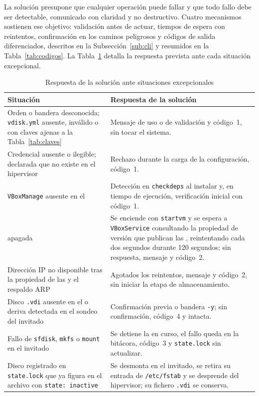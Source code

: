 La solución presupone que cualquier operación puede fallar y que todo fallo debe ser detectable, comunicado con claridad y no destructivo. Cuatro mecanismos sostienen ese objetivo: validación antes de actuar, tiempos de espera con reintentos, confirmación en los caminos peligrosos y códigos de salida diferenciados, descritos en la Subsección~\ref{sub:cli} y resumidos en la Tabla~\ref{tab:codigos}. La Tabla~\ref{tab:casos} detalla la respuesta prevista ante cada situación excepcional.

\begin{table}[H]
    \centering
    \caption{Respuesta de la solución ante situaciones excepcionales}
    \label{tab:casos}
    \begin{tabular}{@{}p{5.8cm}p{10.0cm}@{}}
        \toprule
        \textbf{Situación} & \textbf{Respuesta de la solución} \\
        \midrule
        Orden o bandera desconocida; \texttt{vdisk.yml} ausente, inválido o con claves ajenas a la Tabla~\ref{tab:claves} & Mensaje de uso o de validación y código~1, sin tocar el sistema. \\
        Credencial ausente o ilegible; \vm{} declarada que no existe en el hipervisor & Rechazo durante la carga de la configuración, código~1. \\
        \texttt{VBoxManage} ausente en el \host{} & Detección en \texttt{checkdeps} al instalar y, en tiempo de ejecución, verificación inicial con código~1. \\
        \vm{} apagada & Se enciende con \texttt{startvm} y se espera a \texttt{VBoxService} consultando la propiedad de versión que publican las \guestadditions{}, reintentando cada dos segundos durante 120 segundos; sin respuesta, mensaje y código~2. \\
        Dirección IP no disponible tras la propiedad de las \guestadditions{} y el respaldo ARP & Agotados los reintentos, mensaje y código~2, sin iniciar la etapa de almacenamiento. \\
        Disco \texttt{.vdi} ausente en el \host{} o deriva detectada en el sondeo del invitado & Confirmación previa o bandera \texttt{-y}; sin confirmación, código~4 y \vm{} intacta. \\
        Fallo de \texttt{sfdisk}, \texttt{mkfs} o \texttt{mount} en el invitado & Se detiene la \vm{} en curso, el fallo queda en la bitácora, código~3 y \texttt{state.lock} sin actualizar. \\
        Disco registrado en \texttt{state.lock} que ya figura en el archivo con \texttt{state: inactive} & Se desmonta en el invitado, se retira su entrada de \texttt{/etc/fstab} y se desprende del hipervisor; su fichero \texttt{.vdi} se conserva. \\

\end{tabular}
\end{table}
